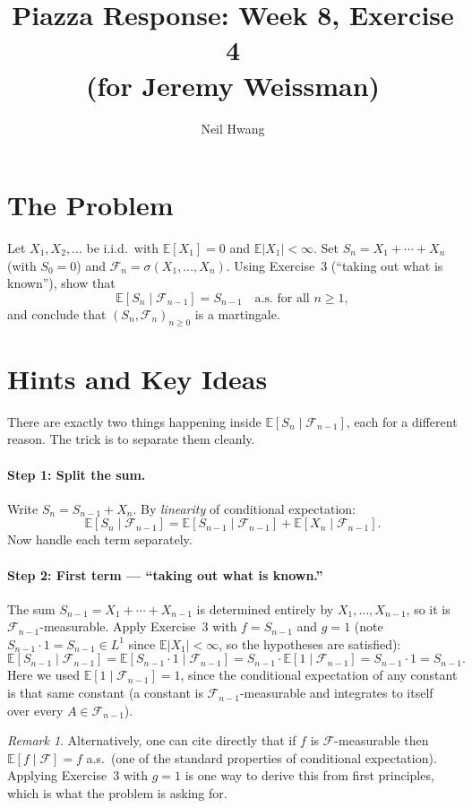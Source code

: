 \documentclass[12pt]{article}
\title{Piazza Response: Week 8, Exercise 4\\
       \large (for Jeremy Weissman)}
\author{Neil Hwang}
\date{}
\theoremstyle{remark}
\newtheorem*{remark}{Remark}
\newcommand{\E}{\mathbb{E}}
\newcommand{\F}{\mathcal{F}}
\begin{document}
\maketitle

\section*{The Problem}

Let $X_1, X_2, \ldots$ be i.i.d.\ with $\E[X_1] = 0$ and $\E|X_1| < \infty$.
Set $S_n = X_1 + \cdots + X_n$ (with $S_0 = 0$) and
$\F_n = \sigma(X_1, \ldots, X_n)$.
Using Exercise~3 (``taking out what is known''), show that
\[
  \E[S_n \mid \F_{n-1}] = S_{n-1} \quad \text{a.s.\ for all } n \ge 1,
\]
and conclude that $(S_n, \F_n)_{n \ge 0}$ is a martingale.

\section*{Hints and Key Ideas}

There are exactly two things happening inside $\E[S_n \mid \F_{n-1}]$,
each for a different reason.  The trick is to separate them cleanly.

\paragraph{Step 1: Split the sum.}
Write $S_n = S_{n-1} + X_n$.  By \emph{linearity} of conditional expectation:
\[
  \E[S_n \mid \F_{n-1}]
  = \E[S_{n-1} \mid \F_{n-1}] + \E[X_n \mid \F_{n-1}].
\]
Now handle each term separately.

\paragraph{Step 2: First term --- ``taking out what is known.''}
The sum $S_{n-1} = X_1 + \cdots + X_{n-1}$ is determined entirely by
$X_1, \ldots, X_{n-1}$, so it is $\F_{n-1}$-measurable.  Apply Exercise~3
with $f = S_{n-1}$ and $g = 1$ (note $S_{n-1} \cdot 1 = S_{n-1} \in L^1$
since $\E|X_1| < \infty$, so the hypotheses are satisfied):
\[
  \E[S_{n-1} \mid \F_{n-1}]
  = \E[S_{n-1} \cdot 1 \mid \F_{n-1}]
  = S_{n-1} \cdot \E[1 \mid \F_{n-1}]
  = S_{n-1} \cdot 1
  = S_{n-1}.
\]
Here we used $\E[1 \mid \F_{n-1}] = 1$, since the conditional expectation of
any constant is that same constant (a constant is $\F_{n-1}$-measurable and
integrates to itself over every $A \in \F_{n-1}$).

\begin{remark}
  Alternatively, one can cite directly that if $f$ is $\F$-measurable then
  $\E[f \mid \F] = f$ a.s.\ (one of the standard properties of conditional
  expectation).  Applying Exercise~3 with $g = 1$ is one way to derive this
  from first principles, which is what the problem is asking for.
\end{remark}
\end{document}
